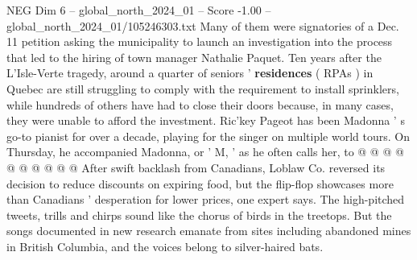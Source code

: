 \begin{textsample}{NEG Dim 6 – global\_north\_2024\_01 – Score -1.00 – global\_north\_2024\_01/105246303.txt}
Many of them were signatories of a Dec. 11 petition asking the municipality to launch an investigation into the process that led to the hiring of town manager Nathalie Paquet.
Ten years after the L'Isle-Verte tragedy, around a quarter of seniors ' \textbf{residences} ( RPAs ) in Quebec are still struggling to comply with the requirement to install sprinklers, while hundreds of others have had to close their doors because, in many cases, they were unable to afford the investment.
Ric'key Pageot has been Madonna ' s go-to pianist for over a decade, playing for the singer on multiple world tours.
On Thursday, he accompanied Madonna, or ' M, ' as he often calls her, to @ @ @ @ @ @ @ @ @ @ After swift backlash from Canadians, Loblaw Co. reversed its decision to reduce discounts on expiring food, but the flip-flop showcases more than Canadians ' desperation for lower prices, one expert says.
The high-pitched tweets, trills and chirps sound like the chorus of birds in the treetops.
But the songs documented in new research emanate from sites including abandoned mines in British Columbia, and the voices belong to silver-haired bats.

\end{textsample}

